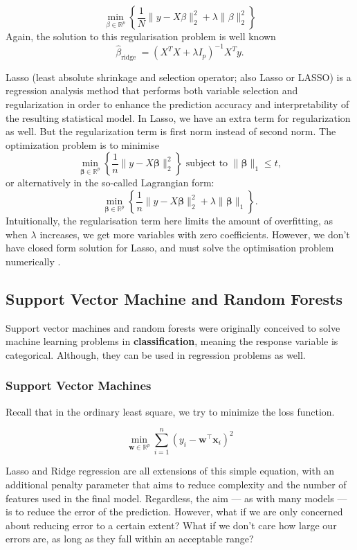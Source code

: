 \documentclass[twoside]{report}
\begin{document}
\begin{spacing}{1}
\[
\min _{\beta \in \mathbb{R}^{p}}\left\{\frac{1}{N}\|y-X \beta\|_{2}^{2}+\lambda\|\beta\|_{2}^{2}\right\}
\]
Again, the solution to this regularisation problem is well known
\[
\widehat{\beta}_{\text {ridge }}=\left(X^{T} X+\lambda I_{p}\right)^{-1} X^{T} y.
\]



Lasso (least absolute shrinkage and selection operator; also Lasso or LASSO) is a regression analysis method that performs both variable selection and regularization in order to enhance the prediction accuracy and interpretability of the resulting statistical model. In Lasso, we have an extra term for regularization as well. But the regularization term is first norm instead of second norm.  The optimization problem is to minimise 
\[
\min _{\boldsymbol{\beta} \in \mathbb{R}^{p}}\left\{\frac{1}{n}\|y-X \boldsymbol{\beta}\|_{2}^{2}\right\} \text { subject to }\|\boldsymbol{\beta}\|_{1} \leq t,
\]
or alternatively in the so-called Lagrangian form:
\[
\min _{\boldsymbol{\beta} \in \mathbb{R}^{p}}\left\{\frac{1}{n}\|y-X \boldsymbol{\beta}\|_{2}^{2}+\lambda\|\boldsymbol{\beta}\|_{1}\right\}.
\]
Intuitionally, the regularisation term here limits the amount of overfitting, as when $\lambda$ increases, we get more variables with zero coefficients. However, we don't have closed form solution for Lasso, and must solve the optimisation problem numerically \cite{weisberg2005applied}.



\subsection{Support Vector Machine and Random Forests}
Support vector machines and random forests were originally conceived to solve machine learning problems in \textbf{classification}, meaning the response variable is categorical. Although, they can be used in regression problems as well.

\subsubsection{Support Vector Machines}
Recall that in the ordinary least square, we try to minimize the loss function. 

\[
\min_{\boldsymbol{w} \in \mathbb{R}^{p}} \sum_{i=1}^{n}\left(y_{i}-\boldsymbol{w}^{\top} \boldsymbol{x}_{i}\right)^{2}
\]

Lasso and Ridge regression are all extensions of this simple equation, with an additional penalty parameter that aims to reduce complexity and the number of features used in the final model. Regardless, the aim — as with many models — is to reduce the error of the prediction. However, what if we are only concerned about reducing error to a certain extent? What if we don’t care how large our errors are, as long as they fall within an acceptable range? 


\end{spacing}
\end{document}
